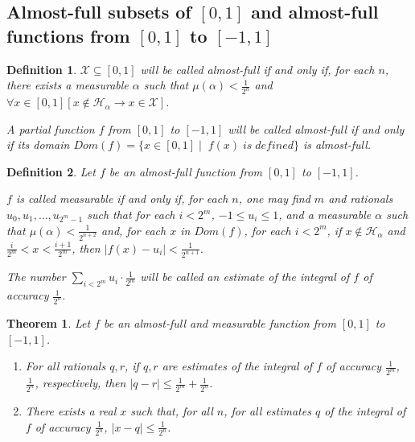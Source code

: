 \documentclass[a4paper]{amsart}
\theoremstyle{plain}
\newtheorem{theorem}{Theorem}
\newtheorem{definition}{Definition}
\begin{document}
 \subsection{Almost-full subsets of $[0,1]$ and  almost-full functions from $[0,1]$ to $[-1,1]$}
 
 \begin{definition} $\mathcal{X}\subseteq [0,1]$ will be called \emph{almost-full} if and only if, for each $n$, there exists a measurable $\alpha$ such that $\mu(\alpha)<\frac{1}{2^n}$ and  $\forall x \in [0,1][x\notin \mathcal{H}_\alpha \rightarrow x  \in \mathcal{X}]$. 
 
 \smallskip A partial function $f$ from $[0,1]$ to $[-1,1]$ will be called \emph{almost-full} if and only if its domain $Dom(f) = \{x\in [0,1]\mid \; f(x)\; is \; defined \}$ is almost-full. \end{definition} 
 
 
 \begin{definition}\label{D:measurablefunction} Let $f$ be an almost-full function from $[0,1]$ to $[-1,1]$. 
 
 $f$ is called \emph{measurable} if and only if, for each $n$, one may find $m$ and rationals $u_0, u_1, \ldots, u_{2^m-1}$ such that for each $i<2^m$, $-1\le u_i\le 1$, and a measurable $\alpha$ such that $\mu(\alpha)<\frac{1}{2^{n+2}}$ and, for each $x$ in $Dom(f)$, for each $i<2^m$, if $x\notin \mathcal{H}_\alpha$ and $\frac{i}{2^m}< x <\frac{i+1}{2^m}$, then $|f(x)-u_i|<\frac{1}{2^{n+1}}$.
 
 \smallskip The number $\sum_{i<2^{m}} u_i\cdot\frac{1}{2^{m}}$ will be called an \emph{estimate of the integral of $f$ of accuracy $\frac{1}{2^{n}}$.}  \end{definition}
  
\begin{theorem}\label{T:integral} Let $f$ be an almost-full  and measurable function from $[0,1]$ to $[-1,1]$. \begin{enumerate}[\upshape (i)] \item For all rationals $q,r$, if $q,r$ are estimates of the integral of $f$ of accuracy  $\frac{1}{2^m}$, $\frac{1}{2^n}$, respectively, then $|q-r| \le \frac{1}{2^m} + \frac{1}{2^n}$. 

\item  There exists a real $x$ such that, for all $n$, for all estimates $q$ of the integral of $f$ of accuracy $\frac{1}{2^n}$, $|x-q|\le \frac{1}{2^n}$. \end{enumerate}\end{theorem}
\end{document}
